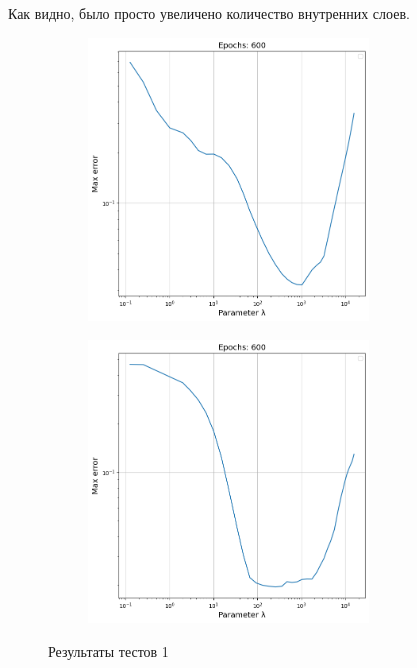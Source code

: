 Как видно, было просто увеличено количество внутренних слоев.

\begin{figure}[ht!]
    \centering
    \begin{subfigure}{0.45\textwidth}{
        \includegraphics[height=7.5cm, keepaspectratio]{images/12.png}
    }
    \end{subfigure}
    \hfill
    \begin{subfigure}{0.45\textwidth}{
        \includegraphics[height=7.5cm, keepaspectratio]{images/13.png}
    }
    \end{subfigure}
    \caption{Результаты тестов 1}
\end{figure}

